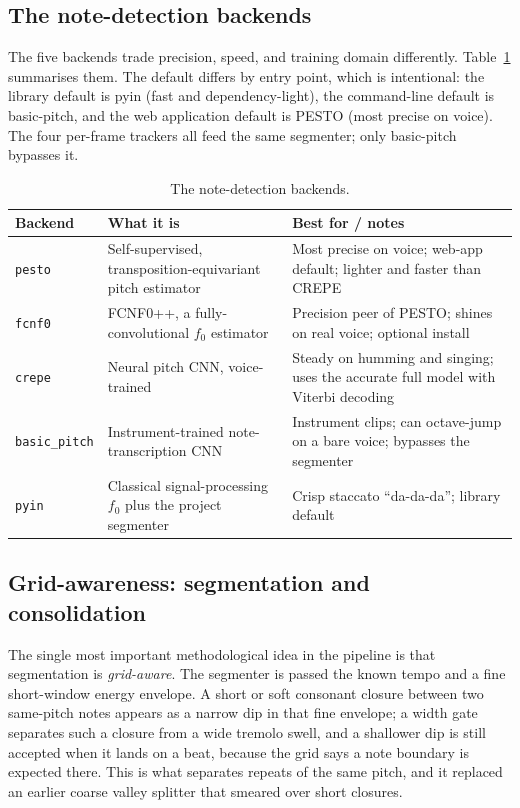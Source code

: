 \documentclass[12pt,a4paper]{article}
\begin{document}
\subsection{The note-detection backends}

The five backends trade precision, speed, and training domain differently.
Table~\ref{tab:backends} summarises them. The default differs by entry point,
which is intentional: the library default is pyin (fast and dependency-light),
the command-line default is basic-pitch, and the web application default is
PESTO (most precise on voice). The four per-frame trackers all feed the same
segmenter; only basic-pitch bypasses it.

\begin{table}[H]
\centering
\caption{The note-detection backends.}
\label{tab:backends}
\begin{tabular}{l p{} p{}}
\toprule
\textbf{Backend} & \textbf{What it is} & \textbf{Best for / notes} \\
\midrule
\texttt{pesto} & Self-supervised, transposition-equivariant pitch estimator &
Most precise on voice; web-app default; lighter and faster than CREPE \\
\texttt{fcnf0} & FCNF0++, a fully-convolutional $f_0$ estimator & Precision
peer of PESTO; shines on real voice; optional install \\
\texttt{crepe} & Neural pitch CNN, voice-trained & Steady on humming and
singing; uses the accurate full model with Viterbi decoding \\
\texttt{basic\_pitch} & Instrument-trained note-transcription CNN & Instrument
clips; can octave-jump on a bare voice; bypasses the segmenter \\
\texttt{pyin} & Classical signal-processing $f_0$ plus the project segmenter &
Crisp staccato ``da-da-da''; library default \\
\bottomrule
\end{tabular}
\end{table}

\subsection{Grid-awareness: segmentation and consolidation}

The single most important methodological idea in the pipeline is that
segmentation is \emph{grid-aware}. The segmenter is passed the known tempo and
a fine short-window energy envelope. A short or soft consonant closure between
two same-pitch notes appears as a narrow dip in that fine envelope; a width
gate separates such a closure from a wide tremolo swell, and a shallower dip is
still accepted when it lands on a beat, because the grid says a note boundary is
expected there. This is what separates repeats of the same pitch, and it
replaced an earlier coarse valley splitter that smeared over short closures.
\end{document}

